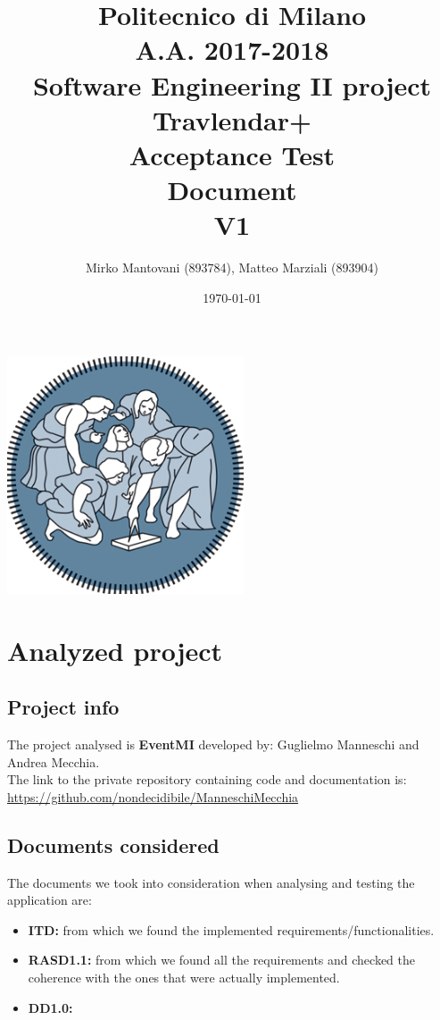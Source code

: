 \documentclass{article}
\author{Mirko Mantovani (893784), Matteo Marziali (893904)}
\date{\today}
\title{Politecnico di Milano
	\\A.A. 2017\@-\@2018
	\\Software Engineering II project \\ \textbf{Travlendar+}
	\\
	\textbf{A}cceptance \textbf{T}est 
	\\ \textbf{D}ocument 
	\\
	\textbf{V1}}
\begin{document}
\maketitle
\begin{center}
	\includegraphics[width=7cm]{polimi-logo}
\end{center}
\clearpage
{\hypersetup{hidelinks}\tableofcontents}


\clearpage
\section{Analyzed project}
\subsection{Project info}
The project analysed is \textbf{EventMI} developed by: Guglielmo Manneschi and Andrea Mecchia.
\\The link to the private repository containing code and documentation is: \\
\href{url}{https://github.com/nondecidibile/ManneschiMecchia}

\subsection{Documents considered}
The documents we took into consideration when analysing and testing the application are:
\begin{itemize}
\item \textbf{ITD:} from which we found the implemented requirements/functionalities.
\item \textbf{RASD1.1:} from which we found all the requirements and checked the coherence with the ones that were actually implemented.
\item \textbf{DD1.0:}
\end{itemize}
\end{document}
